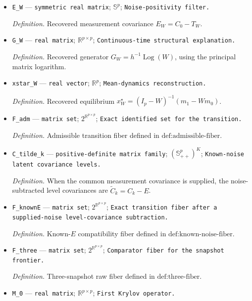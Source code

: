 \documentclass{article}
\begin{document}
\begin{itemize}
  \item \texttt{E\_\allowbreak{}W} --- \texttt{symmetric real matrix}; \(\mathbb S^p\); \texttt{Noise-\allowbreak{}positivity filter.}
  \par\smallskip\noindent\emph{Definition.} Recovered measurement covariance \(E_W=C_0-T_W\).
  \item \texttt{G\_\allowbreak{}W} --- \texttt{real matrix}; \(\mathbb R^{p\times p}\); \texttt{Continuous-\allowbreak{}time structural explanation.}
  \par\smallskip\noindent\emph{Definition.} Recovered generator \(G_W=h^{-1}\operatorname{Log}(W)\), using the principal matrix logarithm.
  \item \texttt{xstar\_\allowbreak{}W} --- \texttt{real vector}; \(\mathbb R^p\); \texttt{Mean-\allowbreak{}dynamics reconstruction.}
  \par\smallskip\noindent\emph{Definition.} Recovered equilibrium \(x_W^\star=(I_p-W)^{-1}(m_1-Wm_0)\).
  \item \texttt{F\_\allowbreak{}adm} --- \texttt{matrix set}; \(2^{\mathbb R^{p\times p}}\); \texttt{Exact identified set for the transition.}
  \par\smallskip\noindent\emph{Definition.} Admissible transition fiber defined in \(\text{def:admissible-fiber}\).
  \item \texttt{C\_\allowbreak{}tilde\_\allowbreak{}k} --- \texttt{positive-\allowbreak{}definite matrix family}; \((\mathbb S_{++}^{p})^K\); \texttt{Known-\allowbreak{}noise latent covariance levels.}
  \par\smallskip\noindent\emph{Definition.} When the common measurement covariance is supplied, the noise-subtracted level covariances are \(\widetilde C_k=C_k-E\).
  \item \texttt{F\_\allowbreak{}knownE} --- \texttt{matrix set}; \(2^{\mathbb R^{p\times p}}\); \texttt{Exact transition fiber after a supplied-\allowbreak{}noise level-\allowbreak{}covariance subtraction.}
  \par\smallskip\noindent\emph{Definition.} Known-\(E\) compatibility fiber defined in \(\text{def:known-noise-fiber}\).
  \item \texttt{F\_\allowbreak{}three} --- \texttt{matrix set}; \(2^{\mathbb R^{p\times p}}\); \texttt{Comparator fiber for the snapshot frontier.}
  \par\smallskip\noindent\emph{Definition.} Three-snapshot raw fiber defined in \(\text{def:three-fiber}\).
  \item \texttt{M\_\allowbreak{}0} --- \texttt{real matrix}; \(\mathbb R^{p\times p}\); \texttt{First Krylov operator.}

\end{itemize}
\end{document}
